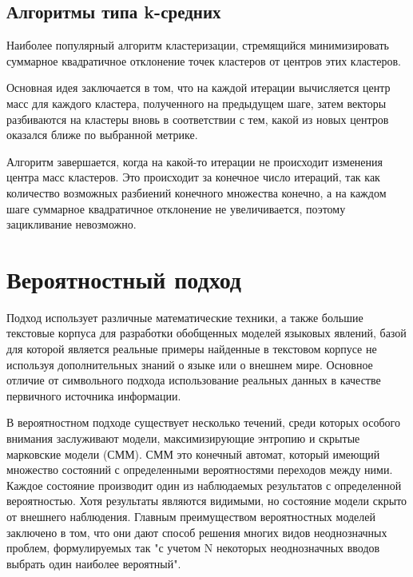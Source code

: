 \documentclass{standalone}
\begin{document}
\subsection{Алгоритмы типа k-средних} %

\par Наиболее популярный алгоритм кластеризации, стремящийся минимизировать суммарное квадратичное отклонение точек кластеров от центров этих кластеров.
\par Основная идея заключается в том, что на каждой итерации вычисляется центр масс для каждого кластера, полученного на предыдущем шаге, затем векторы разбиваются на кластеры вновь в соответствии с тем, какой из новых центров оказался ближе по выбранной метрике.
\par Алгоритм завершается, когда на какой-то итерации не происходит изменения центра масс кластеров. Это происходит за конечное число итераций, так как количество возможных разбиений конечного множества конечно, а на каждом шаге суммарное квадратичное отклонение не увеличивается, поэтому зацикливание невозможно.

\section{Вероятностный подход}
\par Подход использует различные математические техники, а также большие текстовые корпуса для разработки обобщенных моделей языковых явлений, базой для которой является реальные примеры найденные в текстовом корпусе не используя дополнительных знаний о языке или о внешнем мире. Основное отличие от символьного подхода использование реальных данных в качестве первичного источника информации.
\par В вероятностном подходе существует несколько течений, среди которых особого внимания заслуживают модели, максимизирующие энтропию и скрытые марковские модели (СММ). СММ  это конечный автомат, который имеющий множество состояний с определенными вероятностями переходов между ними. Каждое состояние производит один из наблюдаемых результатов с определенной вероятностью. Хотя результаты являются видимыми, но состояние модели скрыто от внешнего наблюдения. Главным преимуществом вероятностных моделей заключено в том, что они дают способ решения многих видов неоднозначных проблем, формулируемых так "с учетом N некоторых неоднозначных вводов выбрать один наиболее вероятный".
\end{document}
